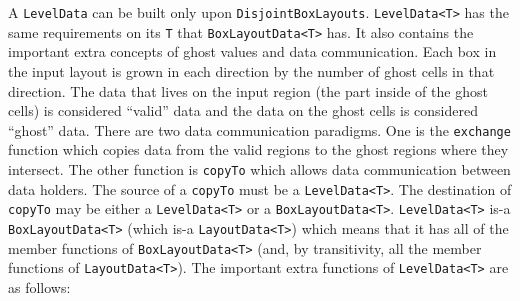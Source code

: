 A {\tt LevelData} can be built
only upon {\tt DisjointBoxLayouts}.
\verb/LevelData<T>/ has the same requirements
on  its \verb/T/ that \verb/BoxLayoutData<T>/ has.
It also contains the important extra concepts
of ghost values and data communication.  Each box 
in the input layout is grown in each direction by the 
number of ghost cells in that direction.  The data 
that lives on the input region (the part inside of the
ghost cells)  is considered ``valid'' data and the
data on the ghost cells is considered ``ghost'' data.
There are two data communication paradigms.  One is 
the \verb/exchange/ function which copies data
from the valid regions to the ghost regions where
they intersect.  The other function is \verb/copyTo/
which allows data communication between data holders.
The source of a \verb/copyTo/ must be a \verb/LevelData<T>/.
The destination of \verb/copyTo/ may be either a \verb/LevelData<T>/
or a \verb/BoxLayoutData<T>/.
\verb/LevelData<T>/ is-a \verb/BoxLayoutData<T>/ 
(which is-a \verb/LayoutData<T>/) which
means that it has all of the member functions of \verb/BoxLayoutData<T>/ 
(and, by transitivity, all the member functions of \verb/LayoutData<T>/).
The important extra functions of \verb/LevelData<T>/ are as follows:
